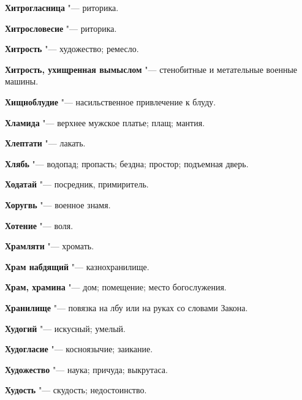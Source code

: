 \begin{mymulticols}{2}
\noindent\textbf{Хитрогласница} "--- риторика. 




\noindent\textbf{Хитрословесие} "--- риторика. 




\noindent\textbf{Хитрость} "--- художество; ремесло. 




\noindent\textbf{Хитрость, ухищренная вымыслом} "--- стенобитные и метательные военные машины. 




\noindent\textbf{Хищноблудие} "--- насильственное привлечение к блуду. 




\noindent\textbf{Хламида} "--- верхнее мужское платье; плащ; мантия. 




\noindent\textbf{Хлептати} "--- лакать. 




\noindent\textbf{Хлябь} "--- водопад; пропасть; бездна; простор; подъемная дверь. 




\noindent\textbf{Ходатай} "--- посредник, примиритель. 




\noindent\textbf{Хоругвь} "--- военное знамя. 




\noindent\textbf{Хотение} "--- воля. 




\noindent\textbf{Храмляти} "--- хромать. 




\noindent\textbf{Храм набдящий} "--- казнохранилище. 




\noindent\textbf{Храм, храмина} "--- дом; помещение; место богослужения. 




\noindent\textbf{Хранилище} "--- повязка на лбу или на руках со словами Закона. 




\noindent\textbf{Худогий} "--- искусный; умелый. 




\noindent\textbf{Худогласие} "--- косноязычие; заикание. 




\noindent\textbf{Художество} "--- наука; причуда; выкрутаса. 




\noindent\textbf{Худость} "--- скудость; недостоинство. 





\end{mymulticols}
